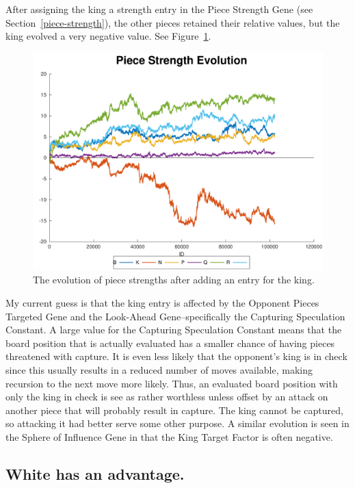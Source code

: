\documentclass[letterpaper]{article}
\renewcommand{\_}{\allowbreak\textunderscore\allowbreak}
\begin{document}
After assigning the king a strength entry in the Piece Strength Gene (see Section~\ref{piece-strength}), the other pieces retained their relative values, but the king evolved a very negative value. See Figure~\ref{piece-strength-with-king-plot}.
\begin{figure}[htb]
	\centering
	\includegraphics[width=\textwidth]{piece-strength-with-king-plot}
	\caption{The evolution of piece strengths after adding an entry for the king.}
	\label{piece-strength-with-king-plot}
\end{figure}

My current guess is that the king entry is affected by the Opponent Pieces Targeted  Gene and the Look-Ahead Gene--specifically the Capturing Speculation Constant. A large value for the Capturing Speculation Constant means that the board position that is actually evaluated has a smaller chance of having pieces threatened with capture. It is even less likely that the opponent's king is in check since this usually results in a reduced number of moves available, making recursion to the next move more likely. Thus, an evaluated board position with only the king in check is see as rather worthless unless offset by an attack on another piece that will probably result in capture. The king cannot be captured, so attacking it had better serve some other purpose. A similar evolution is seen in the Sphere of Influence Gene in that the King Target Factor is often negative.

\subsection{White has an advantage.}
\end{document}
